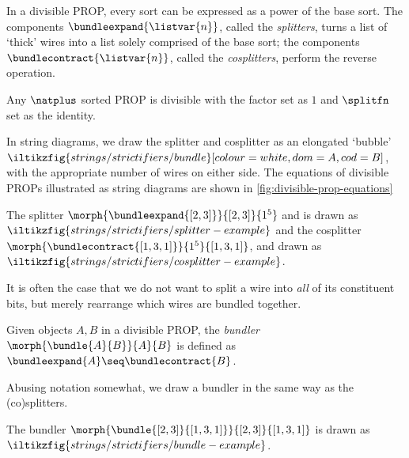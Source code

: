 In a divisible PROP, every sort can be expressed as a power of the base sort.
The components \(
    \bundleexpand{\listvar{n}}
\), called the \emph{splitters}, turns a list of `thick' wires into a list
solely comprised of the base sort; the components \(
    \bundlecontract{\listvar{n}}
\), called the \emph{cosplitters}, perform the reverse operation.

\begin{example}
    Any \(\natplus\) sorted PROP is divisible with the factor set as \(1\) and
    \(\splitfn\) set as the identity.
\end{example}

In string diagrams, we draw the splitter and cosplitter as an elongated `bubble'
\(
    \iltikzfig{strings/strictifiers/bundle}[colour=white,dom=A,cod=B]
\), with the appropriate number of wires on either side.
The equations of divisible PROPs illustrated as string diagrams are shown in
\cref{fig:divisible-prop-equations}

\begin{example}
    The splitter \(
        \morph{\bundleexpand{[2,3]}}{[2,3]}{1^5}
    \) and is drawn as \(
        \iltikzfig{strings/strictifiers/splitter-example}
    \) and the cosplitter \(
        \morph{\bundlecontract{[1,3,1]}}{1^5}{[1,3,1]}
    \), and drawn as \(
        \iltikzfig{strings/strictifiers/cosplitter-example}
    \).
\end{example}



It is often the case that we do not want to split a wire into \emph{all} of its
constituent bits, but merely rearrange which wires are bundled together.

\begin{definition}[Bundler]
    Given objects \(A,B\) in a divisible PROP, the \emph{bundler}
    \(\morph{\bundle{A}{B}}{A}{B}\) is defined as \(
        \bundleexpand{A} \seq \bundlecontract{B}
    \).
\end{definition}

Abusing notation somewhat, we draw a bundler in the same way as the
(co)splitters.

\begin{example}

    The bundler \(\morph{\bundle{[2,3]}{[1,3,1]}}{[2,3]}{[1,3,1]}\)
    is drawn as \(
        \iltikzfig{strings/strictifiers/bundle-example}
    \).
\end{example}